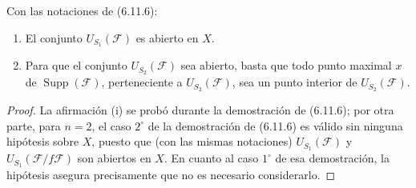 \begin{corollary}[6.11.7]
\label{IV.2.s6.11.7-fr}
Con las notaciones de \textup{(6.11.6)}:
\begin{enumerate}
\item[\textup{(i)}] El conjunto $U_{S_1}(\mathcal F)$ es abierto en $X$.
\item[\textup{(ii)}] Para que el conjunto $U_{S_2}(\mathcal F)$ sea abierto, basta
que todo punto maximal $x$ de $\operatorname{Supp}(\mathcal F)$,
perteneciente a $U_{S_2}(\mathcal F)$, sea un punto interior de
$U_{S_2}(\mathcal F)$.
\end{enumerate}
\end{corollary}

\begin{proof}
La afirmación (i) se probó durante la demostración de (6.11.6);
por otra parte, para $n=2$, el caso $2^\circ$ de la demostración de (6.11.6)
es válido sin ninguna hipótesis sobre $X$, puesto que (con las mismas
notaciones) $U_{S_1}(\mathcal F)$ y
$U_{S_1}(\mathcal F/f\mathcal F)$ son abiertos en $X$. En cuanto al caso
$1^\circ$ de esa demostración, la hipótesis asegura precisamente que no es
necesario considerarlo.
\end{proof}
